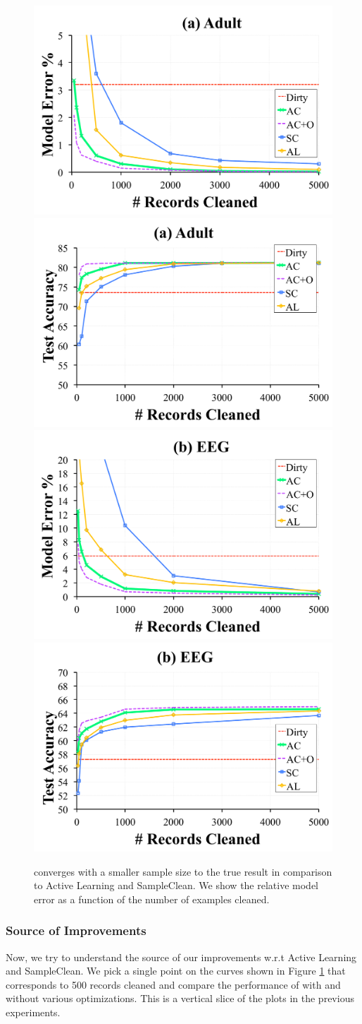 \begin{figure}[ht!]
\centering
 \includegraphics[width=0.49\columnwidth]{exp/exp3b.pdf}
    \includegraphics[width=0.49\columnwidth]{exp/exp3bb.pdf}
  \includegraphics[width=0.49\columnwidth]{exp/exp3c.pdf}
  \includegraphics[width=0.49\columnwidth]{exp/exp3cc.pdf}
 \caption{\sys converges with a smaller sample size to the true result in comparison to Active Learning and SampleClean. We show the relative model error as a function of the number of examples cleaned. \label{prio-perf}}\vspace{-1em}
\end{figure}

\subsubsection{Source of Improvements}
Now, we try to understand the source of our improvements w.r.t Active Learning and SampleClean.
We pick a single point on the curves shown in Figure \ref{prio-perf} that corresponds to 500 records cleaned and compare the performance of \sys with and without various optimizations.
This is a vertical slice of the plots in the previous experiments.

